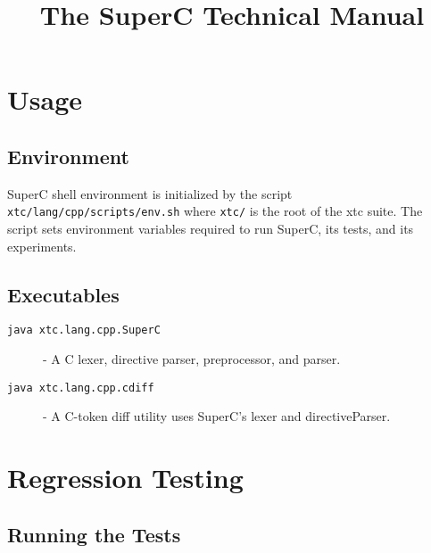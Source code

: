 \documentclass{report}
\newcommand{\SuperC}{{\textsf{Su\-perC}}}
\begin{document}
\title{The \SuperC{} Technical Manual}

\maketitle
\tableofcontents


\chapter{Usage}



\section{Environment}

\SuperC{} shell environment is initialized by the script
\verb"xtc/lang/cpp/scripts/env.sh" where \verb"xtc/" is the root of the xtc
suite.  The script sets environment variables required to run
\SuperC{}, its tests, and its experiments.



\section{Executables}

\begin{description}
\item[\texttt{java xtc.lang.cpp.SuperC}] - A C lexer, directive parser,
  preprocessor, and parser.

\item[\texttt{java xtc.lang.cpp.cdiff}] - A C-token diff utility uses
  SuperC's lexer and directiveParser.
\end{description}


\chapter{Regression Testing}



\section{Running the Tests}
\end{document}
